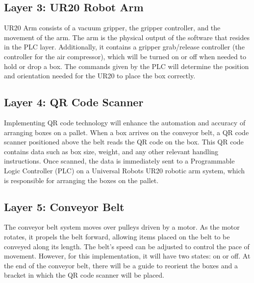 \subsection{Layer 3: UR20 Robot Arm}
UR20 Arm consists of a vacuum gripper, the gripper controller, and the movement of the arm. The arm is the physical output of the software that resides in the PLC layer. Additionally, it contains a gripper grab/release controller (the controller for the air compressor), which will be turned on or off when needed to hold or drop a box. The commands given by the PLC will determine the position and orientation needed for the UR20 to place the box correctly.

\subsection{Layer 4: QR Code Scanner}
Implementing QR code technology will enhance the automation and accuracy of arranging boxes on a pallet. When a box arrives on the conveyor belt, a QR code scanner positioned above the belt reads the QR code on the box. This QR code contains data such as box size, weight, and any other relevant handling instructions. Once scanned, the data is immediately sent to a Programmable Logic Controller (PLC) on a Universal Robots UR20 robotic arm system, which is responsible for arranging the boxes on the pallet.

\subsection{Layer 5: Conveyor Belt}
The conveyor belt system moves over pulleys driven by a motor. As the motor rotates, it propels the belt forward, allowing items placed on the belt to be conveyed along its length. The belt's speed can be adjusted to control the pace of movement. However, for this implementation, it will have two states: on or off. At the end of the conveyor belt, there will be a guide to reorient the boxes and a bracket in which the QR code scanner will be placed.